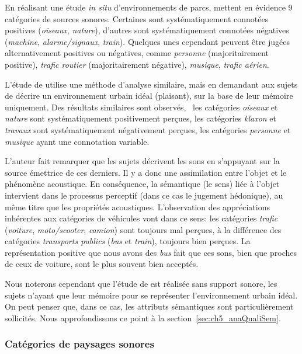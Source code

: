 En réalisant une étude \emph{in situ} d'environnements de parcs, \citep{szeremeta2009analysis} mettent en évidence 9 catégories de sources sonores. Certaines sont systématiquement connotées positives (\emph{oiseaux}, \emph{nature}), d'autres sont systématiquement connotées négatives (\emph{machine}, \emph{alarme/signaux}, \emph{train}). Quelques unes cependant peuvent être jugées alternativement positives ou négatives, comme \emph{personne} (majoritairement positive), \emph{trafic routier} (majoritairement négative), \emph{musique}, \emph{trafic aérien}.

L'étude de \citep{guastavino2006ideal} utilise une méthode d'analyse similaire, mais en demandant aux sujets de décrire un environnement urbain idéal (plaisant), sur la base de leur mémoire uniquement. Des résultats similaires sont observés, \ie~les catégories \emph{oiseaux} et \emph{nature} sont systématiquement positivement perçues, les catégories \emph{klaxon} et \emph{travaux} sont systématiquement négativement perçues, les catégories \emph{personne} et \emph{musique} ayant une connotation variable.

L'auteur fait remarquer que les sujets décrivent les sons en s'appuyant sur la source émettrice de ces derniers. Il y a donc une assimilation entre l'objet et le phénomène acoustique. En conséquence, la sémantique (le sens) liée à l'objet intervient dans le processus perceptif (dans ce cas le jugement hédonique), au même titre que les propriétés acoustiques. L'observation des appréciations inhérentes aux catégories de véhicules vont dans ce sens: les catégories \emph{trafic} (\emph{voiture}, \emph{moto/scooter}, \emph{camion}) sont toujours mal perçues, à la différence des catégories \emph{transports publics} (\emph{bus} et \emph{train}), toujours bien perçues. La représentation positive que nous avons des \emph{bus} fait que ces sons, bien que proches de ceux de voiture, sont le plus souvent bien acceptés.  

Nous noterons cependant que l'étude de \citep{guastavino2006ideal} est réalisée sans support sonore, les sujets n'ayant que leur mémoire pour se représenter l'environnement urbain idéal. On peut penser que, dans ce cas, les attributs sémantiques sont particulièrement sollicités. Nous approfondissons ce point à la section~\ref{sec:ch5_anaQualiSem}.  

\subsubsection{Catégories de paysages sonores}
\label{sec:ch3_catsoundscape}

